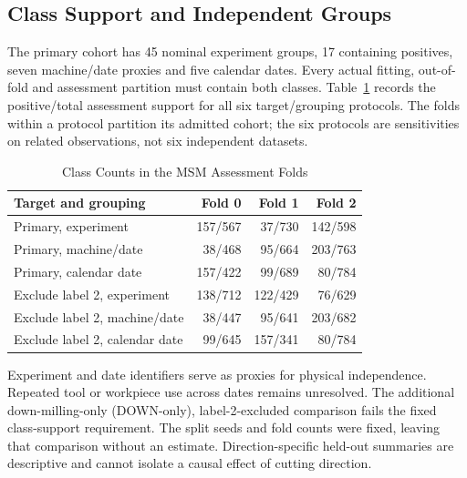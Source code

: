 \subsection{Class Support and Independent Groups}
The primary cohort has 45 nominal experiment groups, 17 containing positives, seven
machine/date proxies and five calendar dates. Every actual fitting, out-of-fold and
assessment partition must contain both classes. Table~\ref{tab:msm-support} records the
positive/total assessment support for all six target/grouping protocols. The folds
within a protocol partition its admitted cohort; the six protocols are sensitivities on
related observations, not six independent datasets.

\begin{table}[htbp]
\caption{Class Counts in the MSM Assessment Folds}\label{tab:msm-support}
\centering\small

\begin{tabular}{lrrr}\toprule
Target and grouping & Fold 0 & Fold 1 & Fold 2\\\midrule
Primary, experiment &157/567&37/730&142/598\\
Primary, machine/date &38/468&95/664&203/763\\
Primary, calendar date &157/422&99/689&80/784\\
Exclude label 2, experiment &138/712&122/429&76/629\\
Exclude label 2, machine/date &38/447&95/641&203/682\\
Exclude label 2, calendar date &99/645&157/341&80/784\\\bottomrule
\end{tabular}
\end{table}

Experiment and date identifiers serve as proxies for physical independence. Repeated
tool or workpiece use across dates remains unresolved. The additional down-milling-only (DOWN-only),
label-2-excluded comparison fails the fixed class-support requirement. The split seeds
and fold counts were fixed, leaving that comparison without an estimate.
Direction-specific held-out summaries are descriptive and cannot isolate a causal effect
of cutting direction.

